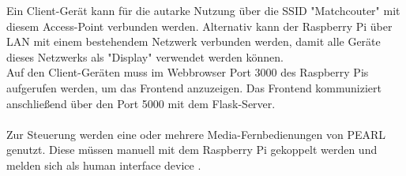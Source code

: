 Ein Client-Gerät kann für die autarke Nutzung über die SSID "Matchcouter" mit diesem Access-Point verbunden werden. Alternativ kann der Raspberry Pi über LAN mit einem bestehendem Netzwerk verbunden werden, damit alle Geräte dieses Netzwerks als "Display" verwendet werden können. \\
Auf den Client-Geräten muss im Webbrowser Port 3000 des Raspberry Pis aufgerufen werden, um das Frontend anzuzeigen. Das Frontend kommuniziert anschließend über den Port 5000 mit dem Flask-Server.\\
\\
Zur Steuerung werden eine oder mehrere Media-Fernbedienungen von PEARL genutzt. Diese müssen manuell mit dem Raspberry Pi gekoppelt werden und melden sich als \glqq human interface device\grqq{} .
             